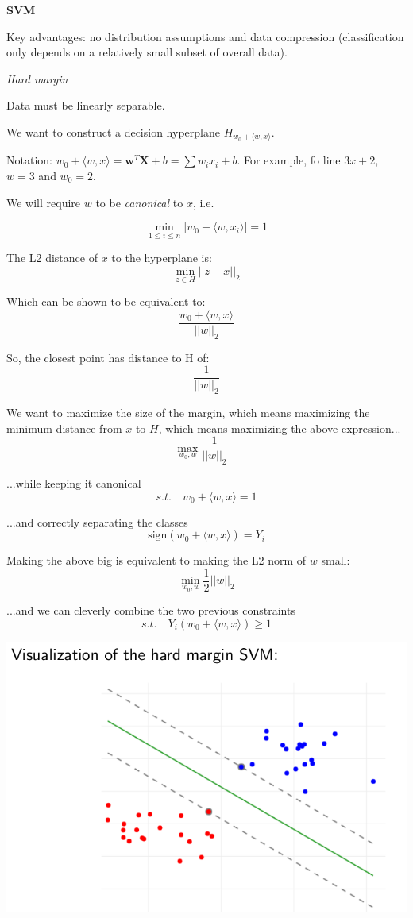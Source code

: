 \documentclass{minimal}
\begin{document}
\medskip

\textbf{SVM}

Key advantages: no distribution assumptions and data compression (classification
only depends on a relatively small subset of overall data).

\smallskip

\textit{Hard margin}

Data must be linearly separable.

We want to construct a decision hyperplane $H_{w_0 + \langle w, x \rangle}$. 

Notation:
$w_0 + \langle w, x \rangle = \mathbf{w}^T\mathbf{X} + b = \sum w_ix_i + b$. For
example, fo line $3x+2$, $w=3$ and $w_0 = 2$.

We will require $w$ to be \textit{canonical} to $x$, i.e.

$$
\min_{1 \leq i \leq n} |w_0 + \langle w, x_i \rangle| = 1
$$

The L2 distance of $x$ to the hyperplane is:
$$
\min_{z \in H}||z-x||_2
$$

Which can be shown to be equivalent to:
$$
\frac{w_0 + \langle w, x \rangle}{||w||_2}
$$

So, the closest point has distance to H of:
$$
\frac{1}{||w||_2}
$$

We want to maximize the size of the margin, which means maximizing the minimum
distance from $x$ to $H$, which means maximizing the above expression...
$$
\max_{w_0, w}  \frac{1}{||w||_2} \quad 
$$

...while keeping it canonical
$$
s.t. \quad w_0 + \langle w, x \rangle = 1 
$$

...and correctly separating the classes
$$
\mathrm{sign}(w_0 + \langle w, x \rangle) = Y_i
$$

Making the above big is equivalent to making the L2 norm of $w$ small:
$$
\min_{w_0, w} \frac{1}{2}||w||_2
$$

...and we can cleverly combine the two previous constraints
$$
s.t. \quad Y_i(w_0 + \langle w, x \rangle)\geq 1
$$

\includegraphics[scale=0.25]{svm1}
\end{document}
